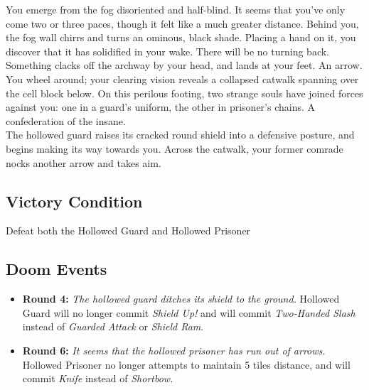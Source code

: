 You emerge from the fog disoriented and half-blind. It seems that you’ve only come two or three paces, though it felt like a much greater distance. Behind you, the fog wall chirrs and turns an ominous, black shade. Placing a hand on it, you discover that it has solidified in your wake. There will be no turning back.\\

Something clacks off the archway by your head, and lands at your feet. An arrow. You wheel around; your clearing vision reveals a collapsed catwalk spanning over the cell block below. On this perilous footing, two strange souls have joined forces against you: one in a guard’s uniform, the other in prisoner’s chains. A confederation of the insane.\\

The hollowed guard raises its cracked round shield into a defensive posture, and begins making its way towards you. Across the catwalk, your former comrade nocks another arrow and takes aim.

\subsection*{Victory Condition}
Defeat both the Hollowed Guard and Hollowed Prisoner

\subsection*{Doom Events}
\begin{itemize}
\item \textbf{Round 4:} \emph{The hollowed guard ditches its shield to the ground.} Hollowed Guard will no longer commit \emph{Shield Up!} and will commit \emph{Two-Handed Slash} instead of \emph{Guarded Attack} or \emph{Shield Ram}.
\item \textbf{Round 6:} \emph{It seems that the hollowed prisoner has run out of arrows.} Hollowed Prisoner no longer attempts to maintain 5 tiles distance, and will commit \emph{Knife} instead of \emph{Shortbow}.
\end{itemize}

